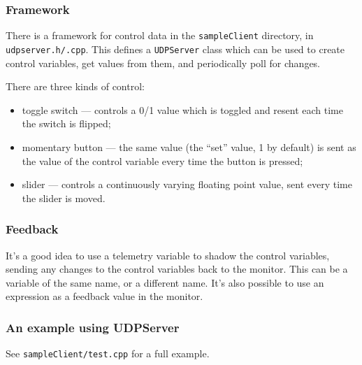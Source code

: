 \subsubsection{Framework}
There is a framework for control data in the \texttt{sampleClient} directory, in \texttt{udpserver.h/.cpp}. This defines
a \texttt{UDPServer} class which can be used to create control variables, get values from them, and periodically poll for changes.

There are three kinds of control:
\begin{itemize}
\item toggle switch --- controls a 0/1 value which is toggled and resent each time the switch is flipped;
\item momentary button --- the same value (the ``set'' value, 1 by default) is sent as the value of the control variable every time the button is pressed;
\item slider --- controls a continuously varying floating point value, sent every time the slider is moved.
\end{itemize}

\subsubsection{Feedback}
It's a good idea to use a telemetry variable to shadow the control variables, sending any changes to the control variables
back to the monitor. This can be a variable of the same name, or a different name. It's also possible to use an expression as a feedback
value in the monitor.

\subsubsection{An example using UDPServer}
See \texttt{sampleClient/test.cpp} for a full example.
